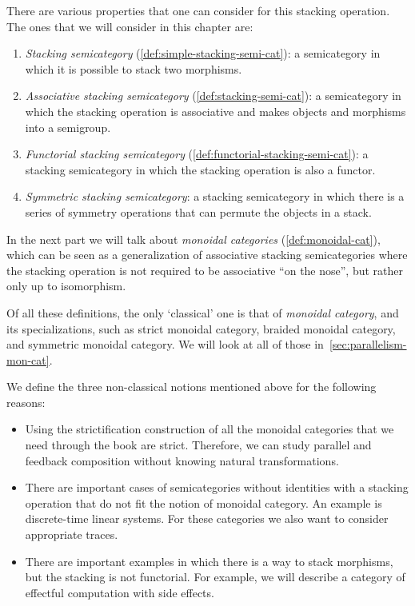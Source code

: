 There are various properties that one can consider for this stacking operation.
The ones that we will consider in this chapter are:
%
\begin{enumerate}
    \item \emph{Stacking semicategory} (\cref{def:simple-stacking-semi-cat}): a semicategory in which it is possible to stack two morphisms.
    \item \emph{Associative stacking semicategory} (\cref{def:stacking-semi-cat}): a semicategory in which the stacking operation is associative and makes objects and morphisms into a semigroup.
    \item \emph{Functorial stacking semicategory} (\cref{def:functorial-stacking-semi-cat}): a stacking semicategory in which the stacking operation is also a functor.
    \item \emph{Symmetric stacking semicategory}: a stacking semicategory in which there is a series of symmetry operations that can permute the objects in a stack.
\end{enumerate}
%
In the next part we will talk about \emph{monoidal categories} (\cref{def:monoidal-cat}), which can be seen as a generalization of associative stacking semicategories where the stacking operation is not required to be associative ``on the nose'', but rather only up to isomorphism.

\begin{remark}
    Of all these definitions, the only `classical' one is that of \emph{monoidal category}, and its specializations, such as strict monoidal category, braided monoidal category, and symmetric monoidal category.
    We will look at all of those in~\cref{sec:parallelism-mon-cat}.

    We define the three non-classical notions mentioned above for the following reasons:
    \begin{itemize}
        \item Using the strictification construction of \SetL all the monoidal categories that we need through the book are strict.
              Therefore, we can study parallel and feedback composition without knowing  natural transformations.

        \item There are important cases of semicategories without identities with a stacking operation that do not fit the notion of monoidal category.
              An example is discrete-time linear systems.
              For these categories we also want to consider appropriate traces.
        \item There are important examples in which there is a way to stack morphisms, but the stacking is not functorial.
              For example, we will describe a category of effectful computation with side effects.
    \end{itemize}
\end{remark}

